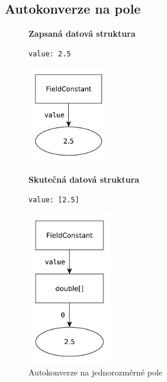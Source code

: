 \documentclass[FM,bw,DP]{tulthesis}
\begin{document}
\subsection{Autokonverze na pole}

\lstset{style=short}


\begin{figure}[ht]
\begin{minipage}[t]{0.45\linewidth}
\vspace{0pt}
\textbf{Zapsaná datová struktura}\\
\vspace{-5pt}
\begin{lstlisting}
value: 2.5
\end{lstlisting}
\vspace*{-20pt}
\begin{center}
\includegraphics[height=120pt]{../img/autoconversion_array_1_before.pdf}
\end{center}
\end{minipage}
\quad
\begin{minipage}[t]{0.45\linewidth}
\vspace{0pt}
\textbf{Skutečná datová struktura}\\
\vspace{-5pt}
\begin{lstlisting}
value: [2.5]
\end{lstlisting}
\vspace*{-20pt}
\begin{center}
\includegraphics[height=190pt]{../img/autoconversion_array_1_after.pdf}
\end{center}
\end{minipage}
\caption{Autokonverze na jednorozměrné pole}
\label{img:autoconversion_array_1}
\end{figure}	
\end{document}
